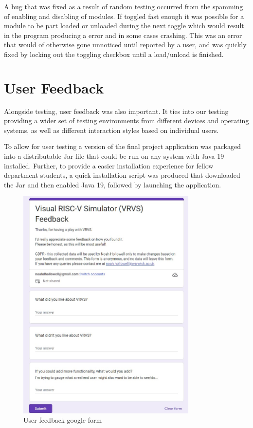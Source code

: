 A bug that was fixed as a result of random testing occurred from the spamming of enabling and disabling of modules. If toggled fast enough it was possible for a module to be part loaded or unloaded during the next toggle which would result in the program producing a error and in some cases crashing. This was an error that would of otherwise gone unnoticed until reported by a user, and was quickly fixed by locking out the toggling checkbox until a load/unload is finished.

\section{User Feedback}
Alongside testing, user feedback was also important. It ties into our testing providing a wider set of testing environments from different devices and operating systems, as well as different interaction styles based on individual users. 

To allow for user testing a version of the final project application was packaged into a distributable Jar file that could be run on any system with Java 19 \cite{sunmicrosystems_2022_java} installed. Further, to provide a easier installation experience for fellow department students, a quick installation script was produced that downloaded the Jar and then enabled Java 19, followed by launching the application.

\begin{figure}
    \centering
    \includegraphics[width=0.8\textwidth]{dissertation/DATA/gform.jpg}
    \caption{User feedback google form}
    \label{fig:gform}
\end{figure}

